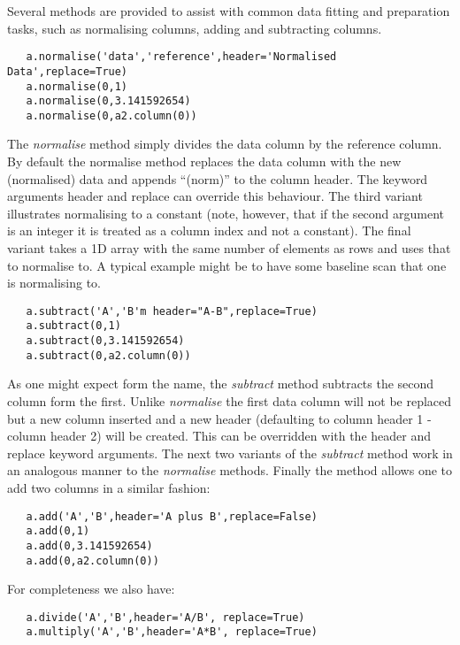 \documentclass[a4paper,11pt]{scrartcl}
\begin{document}
Several methods are provided to assist with common data fitting and preparation tasks, such as normalising columns, adding and subtracting columns.

\begin{lstlisting}
   a.normalise('data','reference',header='Normalised Data',replace=True)
   a.normalise(0,1)
   a.normalise(0,3.141592654)
   a.normalise(0,a2.column(0))
\end{lstlisting}

The \textit{normalise} method simply divides the data column by the reference column. By default the normalise method replaces the data column with the new (normalised) data and appends ``(norm)'' to the column header. The keyword arguments header and replace can override this behaviour. The third variant illustrates normalising to a constant (note, however, that if the second argument is an integer it is treated as a column index and not a constant). The final variant takes a 1D array with the same number of elements as rows and uses that to normalise to. A typical example might be to have some baseline scan that one is normalising to.

\begin{lstlisting}
   a.subtract('A','B'm header="A-B",replace=True)
   a.subtract(0,1)
   a.subtract(0,3.141592654)
   a.subtract(0,a2.column(0))
\end{lstlisting}

As one might expect form the name, the \textit{subtract} method subtracts the second column form the first. Unlike \textit{normalise} the first data column will not be replaced but a new column inserted and a new header (defaulting to column header 1 - column header 2) will be created. This can be overridden with the header and replace keyword arguments. The next two variants of the \textit{subtract} method work in an analogous manner to the \textit{normalise} methods. Finally the  method allows one to add two columns in a similar fashion:

\begin{lstlisting}
   a.add('A','B',header='A plus B',replace=False)
   a.add(0,1)
   a.add(0,3.141592654)
   a.add(0,a2.column(0))
\end{lstlisting}

For completeness we also have:

\begin{lstlisting}
   a.divide('A','B',header='A/B', replace=True)
   a.multiply('A','B',header='A*B', replace=True)
\end{lstlisting}
\end{document}
